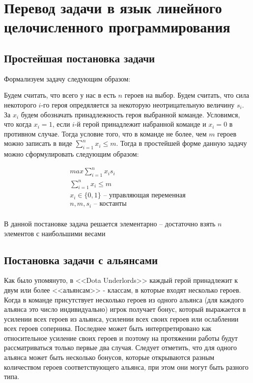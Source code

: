 \documentclass{article}
\begin{document}
\section{Перевод задачи в язык линейного целочисленного программирования }
\label{SectionDUIP}

\subsection{Простейшая постановка задачи}

Формализуем задачу следующим образом:

Будем считать, что всего у нас в есть $n$ героев на выбор. Будем считать, что сила некоторого $i$-го героя опредяляется за некоторую неотрицательную величину $s_i$. За $x_i$ будем обозначать принадлежность героя выбранной команде. Условимся, что когда $x_i = 1$, если $i$-й герой принадлежит набранной команде и $x_i=0$ в противном случае. Тогда условие того, что в команде не более, чем $m$ героев можно записать в виде $\sum_{i=1}^n x_i \leq m$. Тогда в простейшей форме данную задачу можно сформулировать следующим образом:

\begin{equation}
\begin{gathered}
    max \sum_{i=1}^n x_i s_i \\
    \sum_{i=1}^n x_i \leq m \\
    x_i \in \{0, 1\} \text{ – управляющая переменная} \\
   n, m, s_i \text{ – костанты}  \\
\end{gathered}
\end{equation}

В данной постановке задача решается элементарно – достаточно взять $n$ элементов с наибольшими весами

\subsection{Постановка задачи с альянсами}
Как было упомянуто, в <<Dota Underlords>>  каждый герой принадлежит к двум или более <<альянсам>> - классам, в которые входят несколько героев.  Когда в команде присутствует несколько героев из одного альянса (для каждого альянса это число индивидуально) игрок получает бонус, который выражается в усилении всех героев из альянса, усилении всех своих героев или ослаблении всех героев соперника. Последнее может быть интерпретировано как относительное усиление своих героев и поэтому на протяжении работы будут рассматриваться только первые два случая. Следует отметить, что для одного альянса может быть несколько бонусов, которые открываются разным количеством героев соответствующего альянса, при этом они могут быть разного типа.
\end{document}
